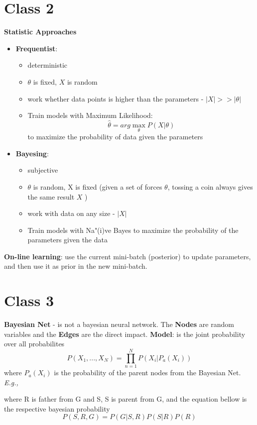 \documentclass{article}
\newcommand{\Eg}{\textit{E.g.,}}
\begin{document}
\section{Class 2}
\textbf{Statistic Approaches}
\begin{itemize}
    \item \textbf{Frequentist}: \begin{itemize}
        \item deterministic
		\item $\theta$ is fixed, $X$ is random
	    \item work whether data points is higher than the parameters - $|X| >> |\theta|$
		\item Train models with Maximum Likelihood: 
		\begin{equation}
		    \hat{\theta} = arg \max_\theta P(X|\theta)
		\end{equation}
	    to maximize the probability of data given the parameters
    \end{itemize}
    
    \item \textbf{Bayesing}: \begin{itemize}
        \item subjective
        \item $\theta$ is random, X is fixed (given a set of forces {$\theta$}, tossing a coin always gives the same result {$X$} )
		\item work with data on any size - $|X|$
		\item Train models with Na"(i)ve Bayes to maximize the probability of the parameters given the data
    \end{itemize}
\end{itemize}

			
\textbf{On-line learning}: use the current mini-batch (posterior) to update parameters, and then use it as prior in the new mini-batch.

\section{Class 3}
\textbf{Bayesian Net} - is not a bayesian neural network. The \textbf{Nodes} are random variables and the \textbf{Edges} are the direct impact.
\textbf{Model}: is the joint probability over all probabilites
\begin{equation}
    P(X_1, ..., X_N) = \prod_{n=1}^{N} P(X_i|P_a(X_i))    
\end{equation}
where $P_a(X_i)$ is the probability of the parent nodes from the Bayesian Net.
\Eg
{} 
where R is father from G and S, S is parent from G, and the equation bellow is the respective bayesian probability
\begin{equation}
    P(S, R, G) = P(G|S, R)P(S|R)P(R)    
\end{equation}
\end{document}
